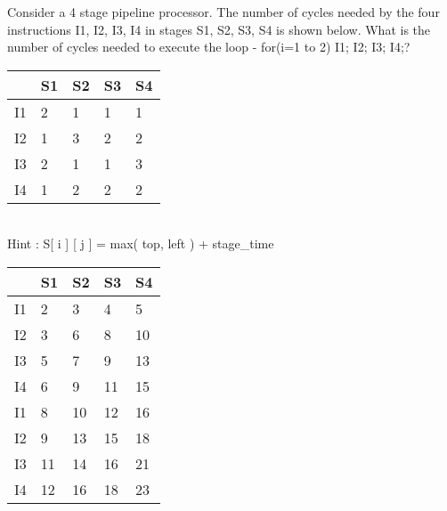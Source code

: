 \begin{questyle}
  \question Consider a 4 stage pipeline processor.   The number of cycles needed by the four
             instructions I1, I2, I3, I4 in stages S1, S2, S3, S4 is shown below. What is the number of cycles needed to execute the loop - for(i=1 to 2) {I1; I2; I3; I4;}?

             \begin{myTableStyle} \begin{tabular}{ |m{1cm}|m{1cm}|m{1cm}|m{1cm}|m{1cm}| } \hline
                   & S1 & S2 & S3 & S4 \\ \hline
                I1 & 2  & 1  & 1  & 1  \\ \hline
                I2 & 1  & 3  & 2  & 2  \\ \hline
                I3 & 2  & 1  & 1  & 3  \\ \hline
                I4 & 1  & 2  & 2  & 2  \\ \hline
              \end{tabular} \end{myTableStyle} \vspace{0.08in}

  \begin{oneparchoices}
  \end{oneparchoices} \\  Hint : \quad S[ i ] [ j ] = max( top, left ) + stage\_time \\

   \begin{myTableStyle} \begin{tabular}{ |m{1cm}|m{1cm}|m{1cm}|m{1cm}|m{1cm}| } \hline
                   & S1 & S2 & S3  & S4 \\ \hline
                I1 & 2  & 3  & 4   & 5  \\ \hline
                I2 & 3  & 6  & 8   & 10  \\ \hline
                I3 & 5  & 7  & 9   & 13  \\ \hline
                I4 & 6  & 9  & 11  & 15  \\ \hline
                I1 & 8  & 10 & 12  & 16  \\ \hline
                I2 & 9  & 13 & 15  & 18  \\ \hline
                I3 & 11 & 14 & 16  & 21  \\ \hline
                I4 & 12 & 16 & 18  & 23  \\ \hline
              \end{tabular} \end{myTableStyle} \vspace{0.08in}

\end{questyle}



